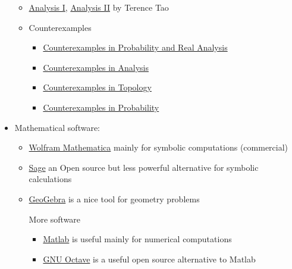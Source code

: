 \documentclass{article}
\begin{document}
\begin{itemize}
\begin{itemize}
        \item \href{https://www.goodreads.com/book/show/502785.Analysis_I}{Analysis I}, \href{https://www.goodreads.com/book/show/2578776-analysis-ii}{Analysis II} by Terence Tao
        
        \item Counterexamples
            \begin{itemize}
            \item \href{https://www.goodreads.com/book/show/1402795.Counterexamples_in_Probability_and_Real_Analysis}{Counterexamples in Probability and Real Analysis}
        
            \item \href{https://www.goodreads.com/en/book/show/818070.Counterexamples_in_Analysis}{Counterexamples in Analysis}
        
            \item \href{https://www.goodreads.com/book/show/116419.Counterexamples_in_Topology}{Counterexamples in Topology}
        
            \item \href{https://www.goodreads.com/book/show/2106285.Counterexamples_in_Probability}{Counterexamples in Probability}
    
    \end{itemize}
        
    \end{itemize}
    
    \item Mathematical software:
    \begin{itemize}
        \item \href{https://www.wolfram.com/mathematica/}{Wolfram Mathematica} mainly for symbolic computations (commercial)
        
        \item \href{https://www.sagemath.org/}{Sage} an Open source but less powerful alternative for symbolic calculations
        
        \item \href{https://www.geogebra.org/}{GeoGebra} is a nice tool for geometry problems
        
        More software
        \begin{itemize}
            \item \href{https://www.mathworks.com/products/matlab.html}{Matlab} is useful mainly for numerical computations
        
            \item \href{https://octave.org/}{GNU Octave} is a useful open source alternative to Matlab


\end{itemize}
\end{itemize}
\end{itemize}
\end{document}
